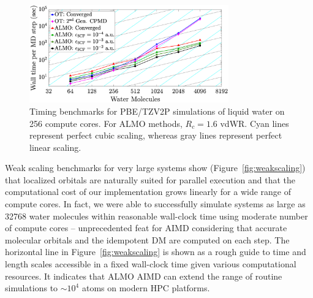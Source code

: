 \documentclass[aps,prl,reprint,amsmath,amssymb]{revtex4-1}
\begin{document}
\begin{figure}
\includegraphics[trim={2.5cm 0.5cm 3.4cm 0.9cm},clip,width=8.6cm]{strongscaling_log.eps}
\caption{\label{fig:strongscaling_log} Timing benchmarks for PBE/TZV2P simulations of liquid water on 256 compute cores. 
For ALMO methods, $R_{c} = 1.6$ vdWR. 
Cyan lines represent perfect cubic scaling, whereas gray lines represent perfect linear scaling. 
}
\end{figure}


Weak scaling benchmarks for very large systems show (Figure~\ref{fig:weakscaling}) that localized orbitals are naturally suited for parallel execution and that the computational cost of our implementation grows linearly for a wide range of compute cores. 
In fact, we were able to successfully simulate systems as large as 32768 water molecules within reasonable wall-clock time using moderate number of compute cores -- unprecedented feat for AIMD considering that accurate molecular orbitals and the idempotent DM are computed on each step.
The horizontal line in Figure~\ref{fig:weakscaling} is shown as a rough guide to time and length scales accessible in a fixed wall-clock time given various computational resources. It indicates that ALMO AIMD can extend the range of routine simulations to $\sim10^4$ atoms on modern HPC platforms. 

\end{document}
